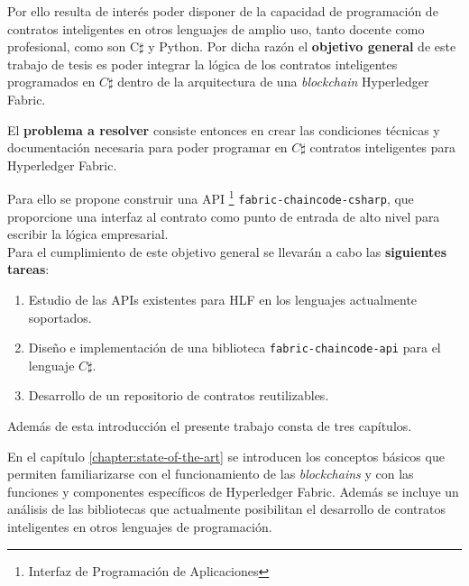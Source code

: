 
Por ello resulta de interés poder disponer de la capacidad de programación de contratos inteligentes en otros lenguajes de amplio uso, tanto docente como profesional, como son C$\sharp$ y Python. Por dicha razón el \textbf{objetivo general} de este trabajo de tesis es poder integrar la lógica de los contratos inteligentes programados en $C\sharp$ dentro de la arquitectura de una \textit{blockchain} Hyperledger Fabric.


El \textbf{problema a resolver} consiste entonces en crear las condiciones técnicas y documentación necesaria para poder programar en $ C\sharp $ contratos inteligentes para Hyperledger Fabric.

Para ello se propone construir una API \footnote{Interfaz de Programación de Aplicaciones} \texttt{fabric-chaincode-csharp},  que proporcione una interfaz al contrato como punto de entrada de alto nivel para escribir la lógica empresarial.\\

Para el cumplimiento de este objetivo general se llevarán a cabo las \textbf{siguientes tareas}:

\begin{enumerate}
\item Estudio de las APIs existentes para HLF en  los lenguajes actualmente soportados.
\item Diseño e implementación de una biblioteca \texttt{fabric-chaincode-api} para el lenguaje $ C\sharp $.
\item Desarrollo de un repositorio de contratos reutilizables.
\end{enumerate}

Además de esta introducción el presente trabajo consta de tres capítulos.

En el capítulo \ref{chapter:state-of-the-art} se introducen los conceptos básicos que permiten familiarizarse con el funcionamiento de las \textit{blockchains} y con las funciones y componentes específicos de Hyperledger Fabric. Además se incluye un análisis de las bibliotecas que  actualmente posibilitan el desarrollo de contratos inteligentes en otros lenguajes de programación.

